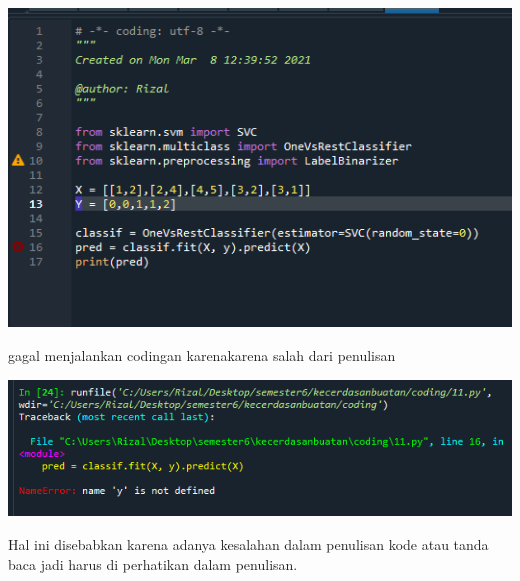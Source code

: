 \documentclass{article}
\begin{document}
\begin{center}
    \includegraphics[width=.8\textwidth]{figures/1184033/chapter1/error3.PNG}
\end{center}
gagal menjalankan codingan karenakarena salah dari penulisan
\begin{center}
    \includegraphics[width=.8\textwidth]{figures/1184033/chapter1/error4.PNG}
\end{center}
Hal ini disebabkan karena adanya kesalahan dalam penulisan kode atau tanda baca jadi harus di perhatikan dalam penulisan.
\end{document}

